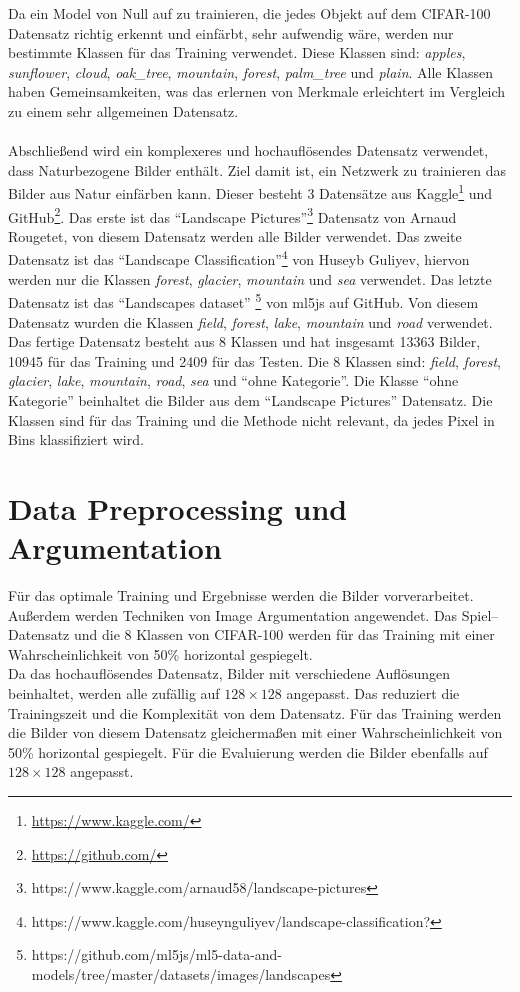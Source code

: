 Da ein Model von Null auf zu trainieren, die jedes Objekt auf dem CIFAR-100 Datensatz richtig erkennt und einfärbt, sehr aufwendig wäre, werden
nur bestimmte Klassen für das Training verwendet. Diese Klassen sind: \textit{apples}, \textit{sunflower}, \textit{cloud}, \textit{oak\_tree},
\textit{mountain}, \textit{forest}, \textit{palm\_tree} und \textit{plain}.
Alle Klassen haben Gemeinsamkeiten, was das erlernen von Merkmale erleichtert im Vergleich zu einem sehr allgemeinen Datensatz.
\\
\\
Abschließend wird ein komplexeres und hochauflösendes Datensatz verwendet, dass Naturbezogene Bilder enthält. Ziel damit ist, ein Netzwerk zu
trainieren das Bilder aus Natur einfärben kann. Dieser besteht 3 Datensätze aus 
Kaggle\footnote{\url{https://www.kaggle.com/}} und GitHub\footnote{\url{https://github.com/}}. 
Das erste ist das ``Landscape Pictures''\footnote{https://www.kaggle.com/arnaud58/landscape-pictures} Datensatz von Arnaud Rougetet, von diesem
Datensatz werden alle Bilder verwendet. Das zweite Datensatz ist das 
``Landscape Classification''\footnote{https://www.kaggle.com/huseynguliyev/landscape-classification?} von Huseyb Guliyev, hiervon werden nur
die Klassen \textit{forest}, \textit{glacier}, \textit{mountain} und \textit{sea} verwendet. Das letzte Datensatz ist das ``Landscapes dataset''
\footnote{https://github.com/ml5js/ml5-data-and-models/tree/master/datasets/images/landscapes} von ml5js auf GitHub. Von diesem Datensatz wurden
die Klassen \textit{field}, \textit{forest}, \textit{lake}, \textit{mountain} und \textit{road} verwendet.
\\
Das fertige Datensatz besteht aus 8 Klassen und hat insgesamt
13363 Bilder, 10945 für das Training und 2409 für das Testen. Die 8 Klassen sind: \textit{field}, \textit{forest}, \textit{glacier}, 
\textit{lake}, \textit{mountain}, \textit{road}, \textit{sea} und ``ohne Kategorie''. 
Die Klasse ``ohne Kategorie'' beinhaltet die Bilder aus dem ``Landscape Pictures'' Datensatz. Die Klassen sind für das Training und 
die Methode nicht relevant, da jedes Pixel in Bins klassifiziert wird.

\section{Data Preprocessing und Argumentation}
Für das optimale Training und Ergebnisse werden die Bilder vorverarbeitet. Außerdem werden Techniken von Image Argumentation angewendet.
Das Spiel–Datensatz und die 8 Klassen von CIFAR-100 werden für das Training mit einer Wahrscheinlichkeit von 50\% horizontal gespiegelt.
\\
Da das hochauflösendes Datensatz, Bilder mit verschiedene Auflösungen beinhaltet, werden alle zufällig auf $ 128 \times 128 $ angepasst. Das 
reduziert die Trainingszeit und die Komplexität von dem Datensatz. Für das Training werden die Bilder von diesem Datensatz gleichermaßen mit einer 
Wahrscheinlichkeit von 50\% horizontal gespiegelt. Für die Evaluierung werden die Bilder ebenfalls auf $ 128 \times 128 $ angepasst.

